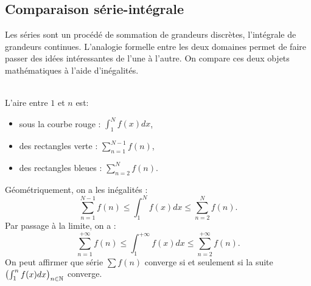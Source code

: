 \documentclass{book}
\begin{document}
\subsection{Comparaison série-intégrale}
Les séries sont un procédé de sommation de grandeurs discrètes, l'intégrale de grandeurs continues. L'analogie formelle entre les deux domaines permet de faire passer des idées intéressantes de l'une à l'autre. On compare ces deux objets mathématiques à l'aide d'inégalités.\\
 \\
L'aire entre $1$ et $n$ est:
\begin{itemize}
\item sous la courbe rouge   : $\int_1^N f(x)dx$,
\item des rectangles verte  : $\sum_{n=1}^{N-1}f(n)$,
\item  des rectangles bleues  : $\sum_{n=2}^{N}f(n)$.
\end{itemize}
Géométriquement, on a les inégalités :
$$\sum_{n=1}^{N-1}f(n)\leq \int_1^N f(x)dx \leq \sum_{n=2}^{N}f(n).$$
Par passage à la limite, on a :
$$\sum_{n=1}^{+\infty}f(n)\leq \int_1^{+\infty} f(x)dx \leq \sum_{n=2}^{+\infty}f(n).$$
On peut affirmer que série $\sum f(n)$ converge si et seulement si la suite $\left( \int_1^n f(x) dx \right)_{n\in\mathbb{N}}$ converge.
\end{document}
